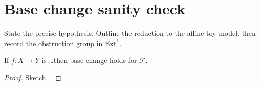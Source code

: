\section{Base change sanity check}
State the precise hypothesis. Outline the reduction to the affine toy model,
then record the obstruction group in $\mathrm{Ext}^1$.
\begin{lemma}
If $f:X\to Y$ is \ldots then base change holds for $\mathcal F$.
\end{lemma}
\begin{proof}
Sketch...
\end{proof}
